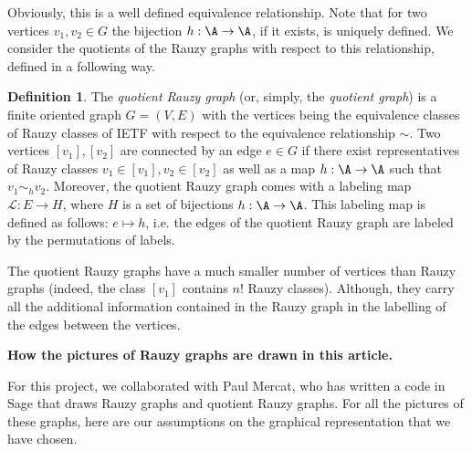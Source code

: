 \documentclass[12pt]{article}
\theoremstyle{definition}
\newtheorem{definition}{Definition}
\begin{document}
Obviously, this is a well defined equivalence relationship. Note that for two vertices $v_1, v_2 \in G$ the bijection $h: \A \rightarrow \A$, if it exists, is uniquely defined. We consider the quotients of the Rauzy graphs with respect to this relationship, defined in a following way.

\begin{definition}
The \emph{quotient Rauzy graph} (or, simply, the \emph{quotient graph}) is a finite oriented graph $G=(V,E)$ with the vertices being the equivalence classes of Rauzy classes of IETF with respect to the equivalence relationship $\sim$. Two vertices $[v_1], [v_2]$ are connected by an edge $e \in G$ if there exist representatives of Rauzy classes $v_1 \in [v_1], v_2 \in [v_2]$ as well as a map $h: \A \rightarrow \A$ such that $v_1 \sim_h v_2$. Moreover, the quotient Rauzy graph comes with a labeling map $\mathcal{L}: E \rightarrow H$, where $H$ is a set of bijections $h: \A \rightarrow \A$. This labeling map is defined as follows: $e \mapsto h$, i.e. the edges of the quotient Rauzy graph are labeled by the permutations of labels.
\end{definition}

The quotient Rauzy graphs have a much smaller number of vertices than Rauzy graphs (indeed, the class $[v_1]$ contains $n!$ Rauzy classes). Although, they carry all the additional information contained in the Rauzy graph in the labelling of the edges between the vertices.






\begin{center}
\textbf{How the pictures of Rauzy graphs are drawn in this article.}
\end{center}

For this project, we collaborated with Paul Mercat, who has written a code in Sage that draws Rauzy graphs and quotient Rauzy graphs. For all the pictures of these graphs, here are our assumptions on the graphical representation that we have chosen. 
\end{document}

